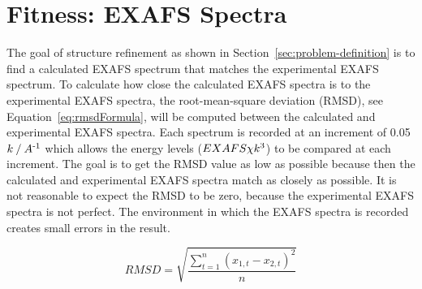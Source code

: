 \section{Fitness: EXAFS Spectra}
\label{sec:fitness-exafs}

The goal of structure refinement as shown in Section~\ref{sec:problem-definition} is to find a calculated EXAFS spectrum that matches the experimental EXAFS spectrum. To calculate how close the calculated EXAFS spectra is to the experimental EXAFS spectra, the root-mean-square deviation (RMSD), see Equation~\ref{eq:rmsdFormula}, will be computed between the calculated and experimental EXAFS spectra. Each spectrum is recorded at an increment of 0.05 $k \mathbin{/} A\textsuperscript{-1}$ which allows the energy levels ($EXAFS \chi k\textsuperscript{3}$) to be compared at each increment. The goal is to get the RMSD value as low as possible because then the calculated and experimental EXAFS spectra match as closely as possible. It is not reasonable to expect the RMSD to be zero, because the experimental EXAFS spectra is not perfect. The environment in which the EXAFS spectra is recorded creates small errors in the result.

\begin{equation}
  \label{eq:rmsdFormula}
  RMSD = \sqrt{\frac{\sum_{t=1}^{n} \left ( x_{1,t}-x_{2,t} \right )^{2}}{n}}
\end{equation}